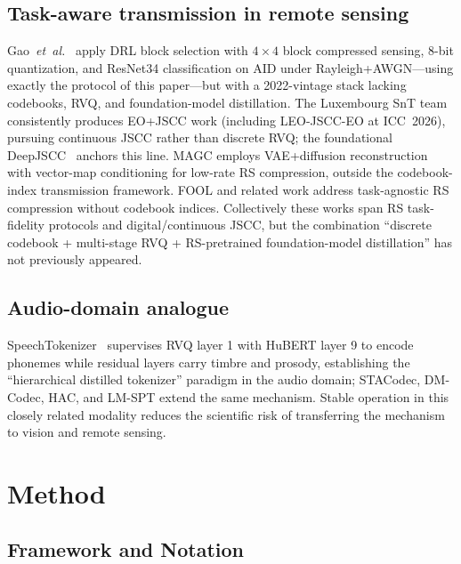 \documentclass[lettersize,journal]{IEEEtran}
\begin{document}
\subsection{Task-aware transmission in remote sensing}
Gao~\textit{et~al.}~\cite{gao2022task} apply DRL block selection with $4{\times}4$ block compressed sensing, 8-bit quantization, and ResNet34 classification on AID under Rayleigh+AWGN---using exactly the protocol of this paper---but with a 2022-vintage stack lacking codebooks, RVQ, and foundation-model distillation. The Luxembourg SnT team consistently produces EO+JSCC work (including LEO-JSCC-EO at ICC~2026), pursuing continuous JSCC rather than discrete RVQ; the foundational DeepJSCC~\cite{deepjscc} anchors this line. MAGC employs VAE+diffusion reconstruction with vector-map conditioning for low-rate RS compression, outside the codebook-index transmission framework. FOOL and related work address task-agnostic RS compression without codebook indices. Collectively these works span RS task-fidelity protocols and digital/continuous JSCC, but the combination ``discrete codebook + multi-stage RVQ + RS-pretrained foundation-model distillation'' has not previously appeared.

\subsection{Audio-domain analogue}
SpeechTokenizer~\cite{zhang2024speechtokenizer} supervises RVQ layer 1 with HuBERT layer 9 to encode phonemes while residual layers carry timbre and prosody, establishing the ``hierarchical distilled tokenizer'' paradigm in the audio domain; STACodec, DM-Codec, HAC, and LM-SPT extend the same mechanism. Stable operation in this closely related modality reduces the scientific risk of transferring the mechanism to vision and remote sensing.

\section{Method}

\subsection{Framework and Notation}
\label{sec:method-arch}
\end{document}

